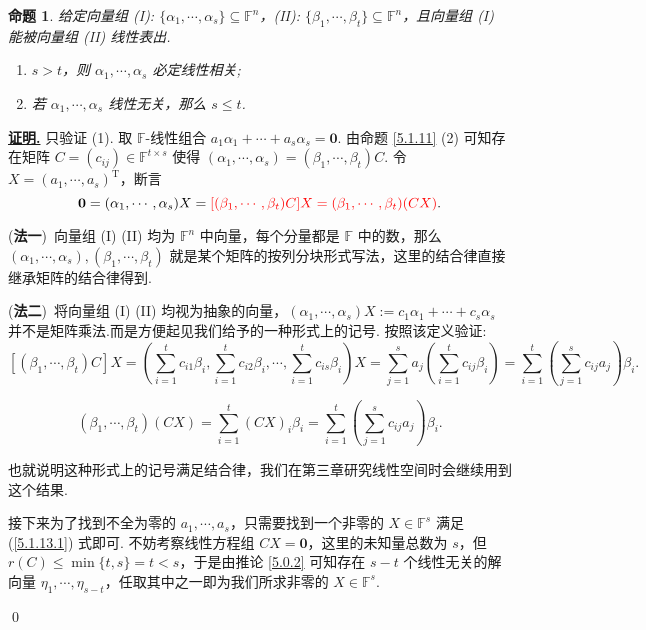 \documentclass[10pt,openany]{article}
\theoremstyle{thmstyle} %
\theoremstyle{defstyle} %
\theoremstyle{prostyle} %
\newtheorem{proposition}[theorem]{命题}
\theoremstyle{exastyle}
\theoremstyle{remstyle}
\renewenvironment{proof}[1][证明]{\par\underline{\textbf{#1.}} \;\fangsong}{\qed\par}
\newcommand{\T}{^{\text{T}}}
\newcommand{\F}{\mathbb{F}}
\begin{document}
\begin{proposition} \label{5.1.13}
	给定向量组 (I): \( \{\alpha_1,\cdots,\alpha_s\} \subseteq \F^n \)，(II): \( \{\beta_1,\cdots,\beta_t\} \subseteq \F^n \)，且向量组 (I) 能被向量组 (II) 线性表出. 
	\begin{enumerate}[(1)]
		\item \( s>t \)，则 \( \alpha_1,\cdots,\alpha_s \) 必定线性相关;
		\item 若 \( \alpha_1,\cdots,\alpha_s \) 线性无关，那么 \( s \leq t \).
	\end{enumerate}
\end{proposition}

\begin{proof}
	只验证 (1). 取 \( \F\)-线性组合 \( a_1\alpha_1+\cdots+a_s\alpha_s=\bm{0} \). 由命题 \ref{5.1.11} (2) 可知存在矩阵 \( C=(c_{ij}) \in \F^{t \times s} \) 使得 \( (\alpha_1,\cdots,\alpha_s)=(\beta_1,\cdots,\beta_t)C \). 令 \( X=(a_1,\cdots,a_s)\T \)，断言 
	\begin{equation}
		\bm{0}=(\alpha_1,\cdots,\alpha_s)X={\color{red} [(\beta_1,\cdots,\beta_t)C]X=(\beta_1,\cdots,\beta_t)(CX)}.
		\label{5.1.13.1}
	\end{equation}
	
	(\textbf{法一})\ 向量组 (I) (II) 均为 \( \F^n \) 中向量，每个分量都是 \( \F \) 中的数，那么 \( (\alpha_1,\cdots,\alpha_s), (\beta_1,\cdots,\beta_t) \) 就是某个矩阵的按列分块形式写法，这里的结合律直接继承矩阵的结合律得到.
	
	(\textbf{法二})\ 将向量组 (I) (II) 均视为抽象的向量，\( (\alpha_1,\cdots,\alpha_s)X:=c_1\alpha_1+\cdots+c_s\alpha_s \) 并不是矩阵乘法.而是方便起见我们给予的一种形式上的记号. 按照该定义验证:
	\[ [(\beta_1,\cdots,\beta_t)C]X=\left( \sum_{i=1}^{t} c_{i1}\beta_i, \sum_{i=1}^{t} c_{i2}\beta_i, \cdots, \sum_{i=1}^{t} c_{is}\beta_i \right)X= \sum_{j=1}^{s} a_j \left( \sum_{i=1}^{t} c_{ij}\beta_i \right)= \sum_{i=1}^{t}\left( \sum_{j=1}^{s} c_{ij}a_j \right) \beta_i. \]
	
	\[ (\beta_1,\cdots,\beta_t)(CX)=\sum_{i=1}^{t} (CX)_i \beta_i= \sum_{i=1}^{t}\left( \sum_{j=1}^{s} c_{ij}a_j \right) \beta_i. \]
	
	也就说明这种形式上的记号满足结合律，我们在第三章研究线性空间时会继续用到这个结果.
	
	接下来为了找到不全为零的 \( a_1,\cdots,a_s \)，只需要找到一个非零的 \( X \in \F^s \) 满足 (\ref{5.1.13.1}) 式即可. 不妨考察线性方程组 \( CX=\bm{0} \)，这里的未知量总数为 \( s \)，但 \( r(C) \leq \min\{t,s\}=t<s \)，于是由推论 \ref{5.0.2} 可知存在 \( s-t \) 个线性无关的解向量 \( \eta_1,\cdots,\eta_{s-t} \)，任取其中之一即为我们所求非零的 \( X \in \F^s \).
	
\end{proof}
\end{document}
